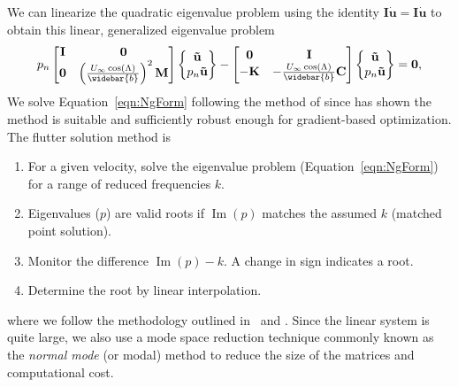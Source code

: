 \documentclass[10pt]{article}
\newcommand{\mbf}[1]{\mathbf{#1}}
\newcommand{\be}{\begin{eqnarray}}
\newcommand{\ee}{\end{eqnarray}}
\newcommand{\Uinf}{U_{\infty}}
\renewcommand{\Im}{\operatorname{Im}}
\begin{document}
We can linearize the quadratic eigenvalue problem using the identity $\mbf{I}\dot{\mbf{u}} = \mbf{I}\dot{\mbf{u}}$ to obtain this linear, generalized eigenvalue problem
%
\be
\label{eqn:NgForm}
p_n
\begin{bmatrix}
	\mbf{I} & \mbf{0}                                                         \\
	\mbf{0} & \left( \frac{\Uinf\cos(\Lambda)}{\widebar{b}} \right)^2 \mbf{M}
\end{bmatrix}
\left\{
\begin{matrix}
	\mbf{\tilde{u}} \\
	p_n\mbf{\tilde{u}}
\end{matrix}
\right\}
-
\begin{bmatrix}
	\mbf{0}  & \mbf{I}                                         \\
	-\mbf{K} & - \frac{\Uinf\cos(\Lambda)}{\widebar{b}}\mbf{C}
\end{bmatrix}
\left\{
\begin{matrix}
	\mbf{\tilde{u}} \\
	p_n\mbf{\tilde{u}}
\end{matrix}
\right\}
=
\mbf{0},
\ee
We solve Equation~\eqref{eqn:NgForm} following the method of \citet{Zyl2001a} since \citet{Jonsson2020b} has shown the method is suitable and sufficiently robust enough for gradient-based optimization.
The flutter solution method is
\begin{enumerate}
	\item For a given velocity, solve the eigenvalue problem (Equation~\eqref{eqn:NgForm}) for a range of reduced frequencies $k$.
	\item Eigenvalues ($p$) are valid roots if $\Im(p)$ matches the assumed $k$ (matched point solution).
	\item Monitor the difference $\Im(p) - k$. A change in sign indicates a root.
	\item Determine the root by linear interpolation.
\end{enumerate}
where we follow the methodology outlined in~\citet{Jonsson2019a} and \citet[Ch. 3]{Jonsson2020b}.
Since the linear system is quite large, we also use a mode space reduction technique commonly known as the \emph{normal mode} (or modal) method to reduce the size of the matrices and computational cost.
\end{document}
